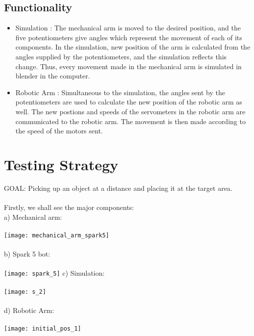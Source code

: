\documentclass[a4wide]{article}
\begin{document}
\subsection{Functionality}
\hbox{}
\begin{itemize}
\item Simulation : 
The mechanical arm is moved to the desired position, and the five potentiometers give angles which represent the movement of each of its components. In the simulation, new position of the arm is calculated from the angles supplied by the potentiometers, and the simulation reflects this change. Thus, every movement made in the mechanical arm is simulated in blender in the computer.\\
\hbox{}
\item Robotic Arm : 
Simultaneous to the simulation, the angles sent by the potentiometers are used to calculate the new position of the robotic arm as well. The new postions and speeds of the servometers in the robotic arm are communicated to the robotic arm. The movement is then made according to the speed of the motors sent.
\end{itemize}
\newpage
\section{Testing Strategy}
GOAL: Picking up an object at a distance and placing it at the target area.
\\
\\
Firstly, we shall see the major components:\\

a) Mechanical arm:\\
\\
\hbox{}
\texttt{[image: mechanical\_arm\_spark5]}
\\
\\
b) Spark 5 bot:\\
\\
\hbox{}
\texttt{[image: spark\_5]}
\newpage
c) Simulation:\\
\\
\hbox{}
\texttt{[image: s\_2]}
\\
\\
d) Robotic Arm:\\
\\
\hbox{}
\texttt{[image: initial\_pos\_1]}
\newpage
\end{document}
